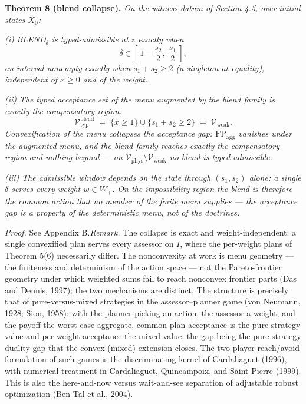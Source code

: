 \documentclass[review,11pt]{elsarticle}
\begin{document}
\textbf{Theorem 8 (blend collapse).} \emph{On the witness datum of
Section 4.5, over initial states \(X_0\):}

\emph{(i)} \emph{BLEND\(_\delta\) is typed-admissible at \(z\) exactly
when}
\[\delta \in \left[\,1 - \frac{s_2}{2},\; \frac{s_1}{2}\,\right],\]
\emph{an interval nonempty exactly when \(s_1 + s_2 \ge 2\) (a singleton
at equality), independent of \(x \ge 0\) and of the weight.}

\emph{(ii)} \emph{The typed acceptance set of the menu augmented by the
blend family is exactly the compensatory region:}
\[\mathcal{V}_{\mathrm{typ}}^{\mathrm{blend}} \;=\; \{ x \ge 1 \} \cup \{ s_1 + s_2 \ge 2 \} \;=\; \mathcal{V}_{\mathrm{weak}}.\]
\emph{Convexification of the menu collapses the acceptance gap:
\(\mathrm{FP}_{\mathrm{agg}}\) vanishes under the augmented menu, and
the blend family reaches exactly the compensatory region and nothing
beyond --- on
\(\mathcal{V}_{\mathrm{phys}} \setminus \mathcal{V}_{\mathrm{weak}}\) no
blend is typed-admissible.}

\emph{(iii)} \emph{The admissible window depends on the state through
\((s_1, s_2)\) alone: a single \(\delta\) serves every weight
\(w \in W_+\). On the impossibility region the blend is therefore the
common action that no member of the finite menu supplies --- the
acceptance gap is a property of the deterministic menu, not of the
doctrines.}

\emph{Proof.} See Appendix B.\emph{Remark.} The collapse is exact and weight-independent: a single
convexified plan serves every assessor on \(I\), where the per-weight
plans of Theorem 5(6) necessarily differ. The nonconvexity at work is
menu geometry --- the finiteness and determinism of the action space ---
not the Pareto-frontier geometry under which weighted sums fail to reach nonconvex frontier parts (Das and Dennis, 1997); the two mechanisms are distinct. The structure is precisely that of
pure-versus-mixed strategies in the assessor--planner game (von Neumann,
1928; Sion, 1958): with the planner picking an action, the assessor a
weight, and the payoff the worst-case aggregate, common-plan acceptance
is the pure-strategy value and per-weight acceptance the mixed value,
the gap being the pure-strategy duality gap that the convex (mixed)
extension closes. The two-player reach/avoid formulation of such games is the discriminating kernel of Cardaliaguet (1996), with numerical treatment in Cardaliaguet, Quincampoix, and Saint-Pierre (1999). This is also the here-and-now versus wait-and-see
separation of adjustable robust optimization (Ben-Tal et al., 2004).
\end{document}
